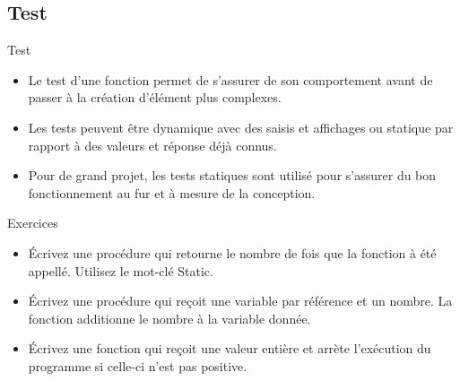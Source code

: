 \documentclass[aspectratio=169,usenames,dvipsnames]{beamer}
\begin{document}
    \subsection{Test}
    \begin{frame}{Test}
        \begin{itemize}
            \item Le test d'une fonction permet de s'assurer de son comportement avant de passer à la création d'élément plus complexes.
            \item Les tests peuvent être dynamique avec des saisis et affichages ou statique par rapport à des valeurs et réponse déjà connus.
            \item Pour de grand projet, les tests statiques sont utilisé pour s'assurer du bon fonctionnement au fur et à mesure de la conception.
        \end{itemize}
    \end{frame}
    \begin{frame}{Exercices}
        \begin{itemize}
            \item Écrivez une procédure qui retourne le nombre de fois que la fonction à été appellé. Utilisez le mot-clé Static.
            \item Écrivez une procédure qui reçoit une variable par référence et un nombre. La fonction additionne le nombre à la variable donnée.
            \item Écrivez une fonction qui reçoit une valeur entière et arrète l'exécution du programme si celle-ci n'est pas positive.
        \end{itemize}
    \end{frame}
\end{document}

